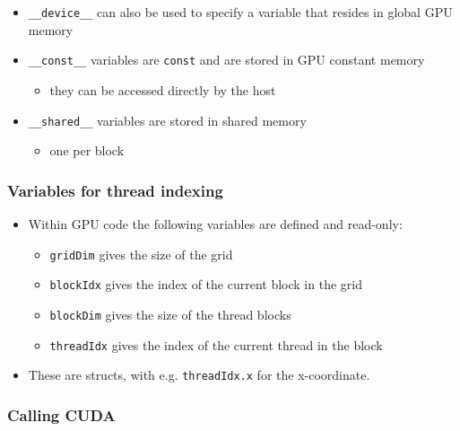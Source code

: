 \begin{itemize}
\itemsep1pt\parskip0pt
\item
  \texttt{\_\_device\_\_} can also be used to specify a variable that
  resides in global GPU memory
\item
  \texttt{\_\_const\_\_} variables are \texttt{const} and are stored in
  GPU constant memory

  \begin{itemize}
  \itemsep1pt\parskip0pt
  \item
    they can be accessed directly by the host
  \end{itemize}
\item
  \texttt{\_\_shared\_\_} variables are stored in shared memory

  \begin{itemize}
  \itemsep1pt\parskip0pt
  \item
    one per block
  \end{itemize}
\end{itemize}

\subsubsection{Variables for thread
indexing}\label{variables-for-thread-indexing}

\begin{itemize}
\itemsep1pt\parskip0pt
\item
  Within GPU code the following variables are defined and read-only:

  \begin{itemize}
  \itemsep1pt\parskip0pt
  \item
    \texttt{gridDim} gives the size of the grid
  \item
    \texttt{blockIdx} gives the index of the current block in the grid
  \item
    \texttt{blockDim} gives the size of the thread blocks
  \item
    \texttt{threadIdx} gives the index of the current thread in the
    block
  \end{itemize}
\item
  These are structs, with e.g. \texttt{threadIdx.x} for the
  x-coordinate.
\end{itemize}

\subsubsection{Calling CUDA}\label{calling-cuda}

